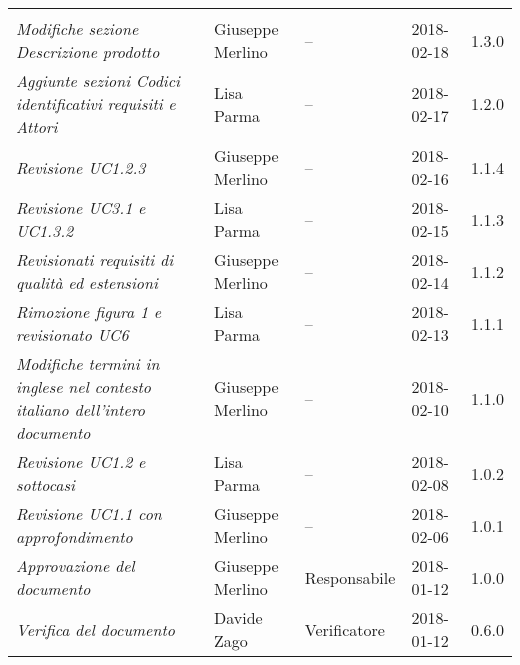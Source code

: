 \newpage 
\section*{}
\begin{table}[H]
	\centering
	\begin{tabular}{p{4cm}|C{3cm}|C{3cm}|R{2.5cm}|R{2cm}}
		
		 & & & & \\
		
		\emph{Modifiche sezione Descrizione prodotto} & Giuseppe Merlino & -- & 2018-02-18 & 1.3.0 \\
		\hline
		
		\emph{Aggiunte sezioni Codici identificativi requisiti e Attori} & Lisa Parma & -- & 2018-02-17 & 1.2.0 \\
		\hline
		
		\emph{Revisione  UC1.2.3 }& Giuseppe Merlino & -- & 2018-02-16 & 1.1.4 \\
		\hline
		
		\emph{Revisione UC3.1 e UC1.3.2}& Lisa Parma & -- & 2018-02-15 & 1.1.3 \\
		\hline
		
		\emph{Revisionati requisiti di qualità ed estensioni}&Giuseppe Merlino & -- & 2018-02-14 & 1.1.2 \\
		\hline
		
		\emph{Rimozione figura 1 e revisionato UC6}& Lisa Parma & -- & 2018-02-13 & 1.1.1 \\
		\hline
		
		\emph{Modifiche termini in inglese nel contesto italiano dell'intero documento}& Giuseppe Merlino & -- & 2018-02-10 & 1.1.0 \\
		\hline
		
		\emph{Revisione UC1.2 e sottocasi}& Lisa Parma & -- & 2018-02-08 & 1.0.2 \\
		\hline
		
		\emph{Revisione UC1.1 con approfondimento}& Giuseppe Merlino & -- & 2018-02-06 & 1.0.1 \\
		\hline
		
		\emph{Approvazione del documento}& Giuseppe Merlino & Responsabile & 2018-01-12 & 1.0.0 \\
		\hline
		
		\emph{Verifica del documento}& Davide Zago & Verificatore & 2018-01-12 & 0.6.0 \\
		\hline
		

\end{tabular}
\end{table}
